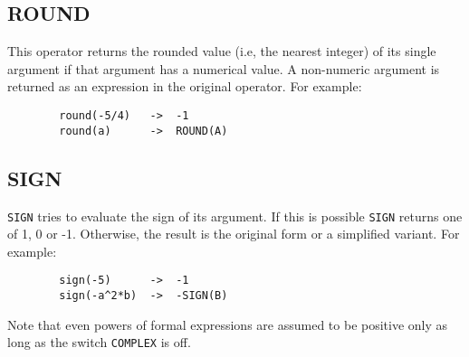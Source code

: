\subsection{ROUND}
\hypertarget{operator:ROUND}{}
This operator returns the rounded value (i.e, the nearest integer) of its
single argument if that argument has a numerical value.  A non-numeric
argument is returned as an expression in the original operator.  For
example:
\begin{verbatim}
        round(-5/4)   ->  -1
        round(a)      ->  ROUND(A)
\end{verbatim}

\subsection{SIGN}
\hypertarget{operator:SIGN}{}
\texttt{SIGN} tries to evaluate the sign of its argument. If this
is possible \texttt{SIGN} returns one of 1, 0 or -1.  Otherwise, the result
is the original form or a simplified variant. For example:
\begin{verbatim}
        sign(-5)      ->  -1
        sign(-a^2*b)  ->  -SIGN(B)
\end{verbatim}
Note that even powers of formal expressions are assumed to be
positive only as long as the switch \texttt{COMPLEX} is off.

